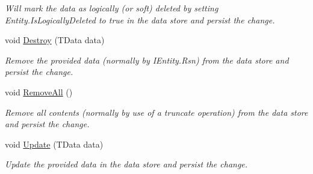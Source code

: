 \begin{DoxyCompactItemize}
\begin{DoxyCompactList}\small\item\em Will mark the {\itshape data}  as logically (or soft) deleted by setting Entity.\+Is\+Logically\+Deleted to true in the data store and persist the change. \end{DoxyCompactList}\item 
void \hyperlink{classCqrs_1_1DataStores_1_1InProcessDataStore_a1fc7a3935f52087f3703b652e77f0b75}{Destroy} (T\+Data data)
\begin{DoxyCompactList}\small\item\em Remove the provided {\itshape data}  (normally by I\+Entity.\+Rsn) from the data store and persist the change. \end{DoxyCompactList}\item 
void \hyperlink{classCqrs_1_1DataStores_1_1InProcessDataStore_acd350f7abef7311064434ae31a50755b}{Remove\+All} ()
\begin{DoxyCompactList}\small\item\em Remove all contents (normally by use of a truncate operation) from the data store and persist the change. \end{DoxyCompactList}\item 
void \hyperlink{classCqrs_1_1DataStores_1_1InProcessDataStore_af70e6f6e5aabc24ee12ef3d2bcd3bf60}{Update} (T\+Data data)
\begin{DoxyCompactList}\small\item\em Update the provided {\itshape data}  in the data store and persist the change. \end{DoxyCompactList}\end{DoxyCompactItemize}
